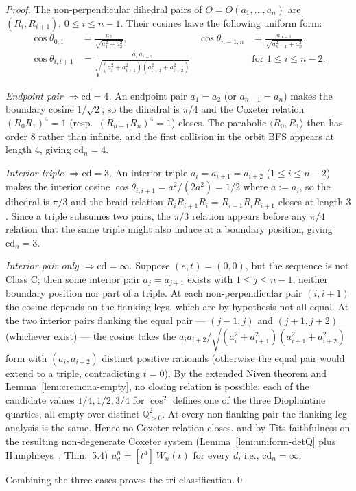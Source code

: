 \documentclass[11pt,a4paper]{article}
\theoremstyle{remark}
\theoremstyle{plain}
\begin{document}
\begin{proof}
The non-perpendicular dihedral pairs of $O = O(a_1, \ldots, a_n)$
are $(R_i, R_{i+1})$, $0 \le i \le n-1$.  Their cosines have the
following uniform form:
\begin{align*}
\cos \theta_{0, 1} &= \frac{a_2}{\sqrt{a_1^2 + a_2^2}}, &
\cos \theta_{n-1, n} &= \frac{a_{n-1}}{\sqrt{a_{n-1}^2 + a_n^2}},
\\
\cos \theta_{i, i+1} &= \frac{a_i\, a_{i+2}}
   {\sqrt{(a_i^2 + a_{i+1}^2)(a_{i+1}^2 + a_{i+2}^2)}}
& &\text{for } 1 \le i \le n-2.
\end{align*}

\emph{Endpoint pair $\Rightarrow \mathrm{cd} = 4$.}  An endpoint
pair $a_1 = a_2$ (or $a_{n-1} = a_n$) makes the boundary cosine
$1/\sqrt 2$, so the dihedral is $\pi/4$ and the Coxeter relation
$(R_0 R_1)^4 = 1$ (resp.\ $(R_{n-1} R_n)^4 = 1$) closes.  The
parabolic $\langle R_0, R_1 \rangle$ then has order $8$ rather than
infinite, and the first collision in the orbit BFS appears at
length $4$, giving $\mathrm{cd}_n = 4$.

\emph{Interior triple $\Rightarrow \mathrm{cd} = 3$.}  An interior
triple $a_i = a_{i+1} = a_{i+2}$ ($1 \le i \le n-2$) makes the
interior cosine $\cos \theta_{i, i+1} = a^2 / (2 a^2) = 1/2$ where
$a := a_i$, so the dihedral is $\pi/3$ and the braid relation
$R_i R_{i+1} R_i = R_{i+1} R_i R_{i+1}$ closes at length $3$.
Since a triple subsumes two pairs, the $\pi/3$ relation appears
before any $\pi/4$ relation that the same triple might also induce
at a boundary position, giving $\mathrm{cd}_n = 3$.

\emph{Interior pair only $\Rightarrow \mathrm{cd} = \infty$.}
Suppose $(e, t) = (0, 0)$, but the sequence is not Class C; then
some interior pair $a_j = a_{j+1}$ exists with $1 \le j \le n-1$,
neither boundary position nor part of a triple.  At each
non-perpendicular pair $(i, i+1)$ the cosine depends on the
flanking legs, which are by hypothesis not all equal.  At the
two interior pairs flanking the equal pair --- $(j-1, j)$ and
$(j+1, j+2)$ (whichever exist) --- the cosine takes the
$a_i a_{i+2} / \sqrt{(a_i^2 + a_{i+1}^2)(a_{i+1}^2 + a_{i+2}^2)}$
form with $(a_i, a_{i+2})$ distinct positive rationals (otherwise
the equal pair would extend to a triple, contradicting $t = 0$).
By the extended Niven theorem and Lemma~\ref{lem:cremona-empty},
no closing relation is possible: each of the candidate values
$1/4, 1/2, 3/4$ for $\cos^2$ defines one of the three Diophantine
quartics, all empty over distinct $\mathbb{Q}_{>0}^2$.  At every
non-flanking pair the flanking-leg analysis is the same.  Hence no
Coxeter relation closes, and by Tits faithfulness on the resulting
non-degenerate Coxeter system (Lemma~\ref{lem:uniform-detQ} plus
Humphreys~\cite{humphreys90}, Thm.~5.4) $u_d^n = [t^d]\, W_n(t)$
for every $d$, i.e., $\mathrm{cd}_n = \infty$.

Combining the three cases proves the tri-classification.\qed
\end{proof}
\end{document}
